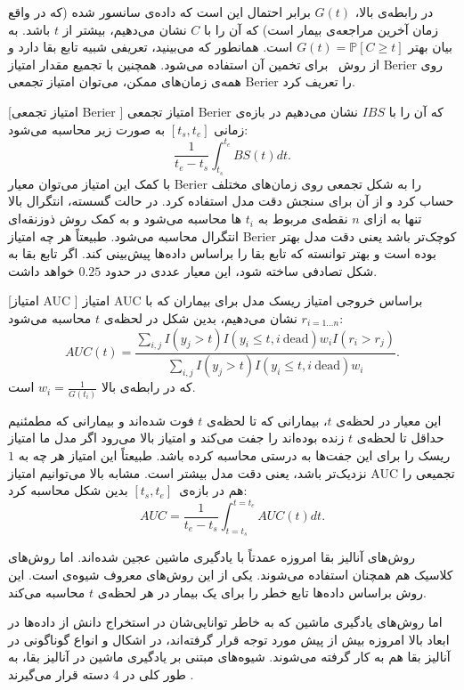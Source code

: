 در رابطه‌ی بالا، $G(t)$ برابر احتمال این است که داده‌ی سانسور شده (که در واقع زمان آخرین مراجعه‌ی بیمار است) که آن را با $C$ نشان می‌دهیم، بیشتر از $t$ باشد. به بیان بهتر
$G(t) = \mathbb{P}\left[C \geq t\right]$
است. همانطور که می‌بینید، تعریفی شبیه تابع بقا دارد و از
روش~ برای تخمین آن استفاده می‌شود. همچنین با تجمیع مقدار امتیاز Berier روی همه‌ی زمان‌های ممکن، می‌توان امتیاز تجمعی Berier  را تعریف کرد.

[امتیاز تجمعی Berier ]
امتیاز تجمعی Berier که آن را با $IBS$ نشان می‌دهیم در بازه‌ی زمانی 
$\left[t_s, t_e\right]$
به صورت زیر محاسبه می‌شود:
$$\frac{1}{t_e-t_s} \int_{t_s}^{t_e} BS(t) dt.$$
با کمک این امتیاز می‌توان معیار Berier را به شکل تجمعی روی  زمان‌های مختلف حساب کرد و از آن برای سنجش دقت مدل استفاده کرد. در حالت گسسته، انتگرال بالا تنها به ازای $n$ نقطه‌ی مربوط به $t_i$ ها محاسبه می‌شود و به کمک روش ذوزنقه‌ای  انتگرال محاسبه می‌شود. طبیعتاً هر چه امتیاز Berier کوچک‌تر باشد یعنی دقت مدل بهتر بوده است و بهتر توانسته که تابع بقا را براساس داده‌ها پیش‌بینی کند. اگر تابع بقا به شکل تصادفی ساخته شود، این معیار عددی در حدود $0.25$ خواهد داشت.

[امتیاز AUC ]
امتیاز AUC براساس خروجی امتیاز ریسک مدل برای بیماران که با 
$r_{i=1...n}$
نشان می‌دهیم، بدین شکل در لحظه‌ی $t$ محاسبه می‌شود:
$$AUC(t) =
\frac{\sum_{i, j} I(y_j>t) I(y_i\leq t, i\ \text{dead}) w_i I(r_i > r_j)}
{\sum_{i, j}I(y_j>t) I(y_i\leq t, i\ \textrm{dead}) w_i}.$$
که در رابطه‌ی بالا
 $w_i=\frac{1}{G(t_i)}$
است.

این معیار در لحظه‌ی $t$، بیمارانی که تا لحظه‌ی $t$ فوت شده‌اند و بیمارانی که مطمئنیم حداقل تا لحظه‌ی $t$ زنده بوده‌اند را جفت می‌کند و امتیاز بالا می‌رود اگر مدل ما امتیاز ریسک را برای این جفت‌ها به درستی محاسبه کرده باشد. طبیعتاً این امتیاز هر چه به $1$ نزدیک‌تر باشد، یعنی دقت مدل بیشتر است. مشابه بالا می‌توانیم امتیاز AUC تجمیعی را هم در بازه‌ی~$\left[t_s, t_e\right]$
بدین شکل محاسبه کرد:
$$AUC = \frac{1}{t_e-t_s} \int_{t=t_s}^{t=t_e} AUC(t) dt.$$


روش‌های آنالیز بقا امروزه عمدتاً با یادگیری ماشین عجین شده‌اند. اما روش‌های کلاسیک هم همچنان استفاده می‌شوند. یکی از این روش‌های معروف شیوه‌ی  است. این روش براساس داده‌ها تابع خطر را برای یک بیمار در هر لحظه‌ی $t$ محاسبه می‌کند.

اما روش‌های یادگیری ماشین که به خاطر توانایی‌شان در استخراج دانش از داده‌ها در ابعاد بالا امروزه بیش از پیش مورد توجه قرار گرفته‌اند، در اشکال و انواع گوناگونی در آنالیز بقا هم به کار گرفته می‌شوند.
شیوه‌های مبتنی بر یادگیری ماشین در آنالیز بقا، به طور کلی در $4$ دسته قرار می‌گیرند . 

